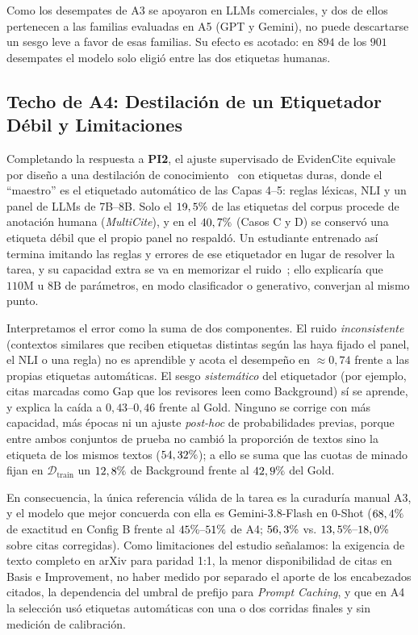 \documentclass[conference]{IEEEtran}
\newcommand{\pct}{\mbox{\symbol{37}}}
\begin{document}
Como los desempates de A3 se apoyaron en LLMs comerciales, y dos de ellos pertenecen a las familias evaluadas en A5 (GPT y Gemini), no puede descartarse un sesgo leve a favor de esas familias. Su efecto es acotado: en $894$ de los $901$ desempates el modelo solo eligió entre las dos etiquetas humanas.

\subsection{Techo de A4: Destilación de un Etiquetador Débil y Limitaciones}

Completando la respuesta a \textbf{PI2}, el ajuste supervisado de EvidenCite equivale por diseño a una destilación de conocimiento~\cite{hinton2015distilling} con etiquetas duras, donde el ``maestro'' es el etiquetado automático de las Capas 4--5: reglas léxicas, NLI y un panel de LLMs de 7B--8B. Solo el $19,5\pct{}$ de las etiquetas del corpus procede de anotación humana (\textit{MultiCite}), y en el $40,7\pct{}$ (Casos C y D) se conservó una etiqueta débil que el propio panel no respaldó. Un estudiante entrenado así termina imitando las reglas y errores de ese etiquetador en lugar de resolver la tarea, y su capacidad extra se va en memorizar el ruido~\cite{arpit2017closer}; ello explicaría que $110\text{M}$ u $8\text{B}$ de parámetros, en modo clasificador o generativo, converjan al mismo punto.

Interpretamos el error como la suma de dos componentes. El ruido \textit{inconsistente} (contextos similares que reciben etiquetas distintas según las haya fijado el panel, el NLI o una regla) no es aprendible y acota el desempeño en $\approx 0,74$ frente a las propias etiquetas automáticas. El sesgo \textit{sistemático} del etiquetador (por ejemplo, citas marcadas como Gap que los revisores leen como Background) sí se aprende, y explica la caída a $0,43\text{--}0,46$ frente al Gold. Ninguno se corrige con más capacidad, más épocas ni un ajuste \textit{post-hoc} de probabilidades previas, porque entre ambos conjuntos de prueba no cambió la proporción de textos sino la etiqueta de los mismos textos ($54,32\pct{}$); a ello se suma que las cuotas de minado fijan en $\mathcal{D}_{\text{train}}$ un $12,8\pct{}$ de Background frente al $42,9\pct{}$ del Gold.

En consecuencia, la única referencia válida de la tarea es la curaduría manual A3, y el modelo que mejor concuerda con ella es Gemini-3.8-Flash en 0-Shot ($68,4\pct{}$ de exactitud en Config B frente al $45\pct{}\text{--}51\pct{}$ de A4; $56,3\pct{}$ vs. $13,5\pct{}\text{--}18,0\pct{}$ sobre citas corregidas). Como limitaciones del estudio señalamos: la exigencia de texto completo en arXiv para paridad 1:1, la menor disponibilidad de citas en Basis e Improvement, no haber medido por separado el aporte de los encabezados citados, la dependencia del umbral de prefijo para \textit{Prompt Caching}, y que en A4 la selección usó etiquetas automáticas con una o dos corridas finales y sin medición de calibración.
\end{document}
